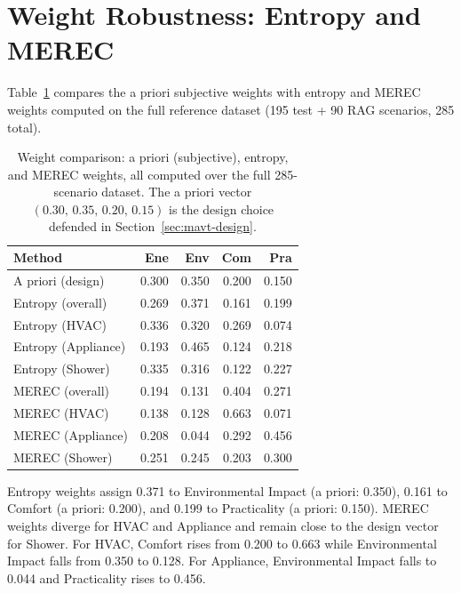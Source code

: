 \documentclass[final,3p,times]{elsarticle}
\begin{document}


\newpage
\appendix
\cleardoublepage
\renewcommand{\thetable}{A.\arabic{table}}
\renewcommand{\theHtable}{A.\arabic{table}}
\setcounter{table}{0}
\renewcommand{\thefigure}{A.\arabic{figure}}
\renewcommand{\theHfigure}{A.\arabic{figure}}
\setcounter{figure}{0}
\FloatBarrier
\section{Weight Robustness: Entropy and MEREC}
\label{app:weights}

Table~\ref{tab:weight_comparison} compares the a priori subjective weights with entropy and MEREC weights computed on the full reference dataset (195 test + 90 RAG scenarios, 285 total).

\begin{table}[htpb]
\small
\centering
\renewcommand{\arraystretch}{1.15}
\caption{Weight comparison: a priori (subjective), entropy, and MEREC weights, all computed over the full 285-scenario dataset. The a priori vector $(0.30,\,0.35,\,0.20,\,0.15)$ is the design choice defended in Section~\ref{sec:mavt-design}.}
\label{tab:weight_comparison}
\begin{tabular}{@{}l rrrr@{}}
\toprule
\textbf{Method} & Ene & Env & Com & Pra \\
\midrule
A priori (design)         & 0.300 & 0.350 & 0.200 & 0.150 \\
Entropy (overall)         & 0.269 & 0.371 & 0.161 & 0.199 \\
Entropy (HVAC)            & 0.336 & 0.320 & 0.269 & 0.074 \\
Entropy (Appliance)       & 0.193 & 0.465 & 0.124 & 0.218 \\
Entropy (Shower)          & 0.335 & 0.316 & 0.122 & 0.227 \\
\midrule
MEREC (overall)           & 0.194 & 0.131 & 0.404 & 0.271 \\
MEREC (HVAC)              & 0.138 & 0.128 & 0.663 & 0.071 \\
MEREC (Appliance)         & 0.208 & 0.044 & 0.292 & 0.456 \\
MEREC (Shower)            & 0.251 & 0.245 & 0.203 & 0.300 \\
\bottomrule
\end{tabular}
\renewcommand{\arraystretch}{1.0}
\end{table}

Entropy weights assign 0.371 to Environmental Impact (a priori: 0.350), 0.161 to Comfort (a priori: 0.200), and 0.199 to Practicality (a priori: 0.150). MEREC weights diverge for HVAC and Appliance and remain close to the design vector for Shower. For HVAC, Comfort rises from 0.200 to 0.663 while Environmental Impact falls from 0.350 to 0.128. For Appliance, Environmental Impact falls to 0.044 and Practicality rises to 0.456.
\end{document}

